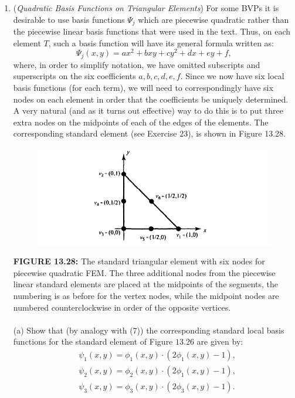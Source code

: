 \documentclass[../main.tex]{subfiles}
\begin{document}
\begin{enumerate}
	\item (\textit{Quadratic Basis Functions on Triangular Elements}) For some BVPs it is desirable to use basis functions $\Psi_{j}$ which are piecewise quadratic rather than the piecewise linear basis functions that were used in the text. Thus, on each element $T$, such a basis function will have its general formula written as:
$$
\Psi_{j}(x, y)=a x^{2}+b x y+c y^{2}+d x+e y+f,
$$
where, in order to simplify notation, we have omitted subscripts and superscripts on the six coefficients $a, b, c, d, e, f$. Since we now have six local basis functions (for each term), we will need to correspondingly have six nodes on each element in order that the coefficients be uniquely determined. A very natural (and as it turns out effective) way to do this is to put three extra nodes on the midpoints of each of the edges of the elements. The corresponding standard element (see Exercise 23), is shown in Figure 13.28.
\begin{figure}[H]
\includegraphics[width=0.9\linewidth]{13}
	\centering
	\label{pfig:ch13_8}
\end{figure}
\textbf{FIGURE 13.28:} The standard triangular element with six nodes for piecewise quadratic FEM. 
The three additional nodes from the piecewise linear standard elements are placed at the 
midpoints of the segments, the numbering is as before for the vertex nodes, while the midpoint 
nodes are numbered counterclockwise in order of the opposite vertices.
\\
\\
(a) Show that (by analogy with (7)) the corresponding standard local basis functions for the standard element of Figure $13.26$ are given by:
$$
\begin{aligned}
&\psi_{1}(x, y)=\phi_{1}(x, y) \cdot\left(2 \phi_{1}(x, y)-1\right), \\
&\psi_{2}(x, y)=\phi_{2}(x, y) \cdot\left(2 \phi_{1}(x, y)-1\right), \\
&\psi_{3}(x, y)=\phi_{3}(x, y) \cdot\left(2 \phi_{3}(x, y)-1\right) . \\

\end{aligned}$$
\end{enumerate}
\end{document}
